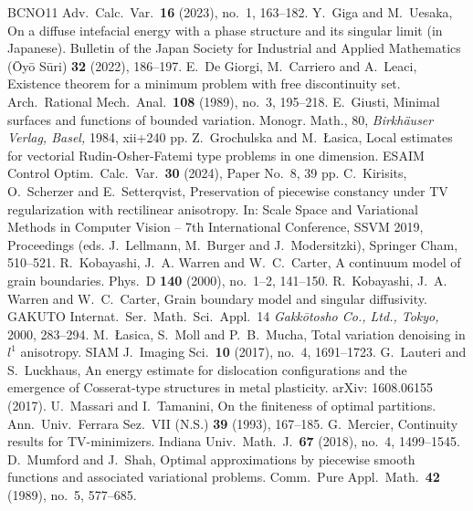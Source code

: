 \documentclass[11pt]{amsart} %
\numberwithin{equation}{section}
\begin{document}
\begin{thebibliography}{BCNO11}
Adv.\ Calc.\ Var.\ {\bf16} (2023), no.\ 1, 163--182.
%
Y.\ Giga and M.\ Uesaka, 
On a diffuse intefacial energy with a phase structure and its singular limit (in Japanese). 
Bulletin of the Japan Society for Industrial and Applied Mathematics (\={O}y\={o} S\={u}ri) {\bf32} (2022), 186--197.
%
E.\ De Giorgi, M.\ Carriero and A.\ Leaci, 
Existence theorem for a minimum problem with free discontinuity set. 
Arch.\ Rational Mech.\ Anal.\ {\bf108} (1989), no.\ 3, 195--218.
%
E.\ Giusti, 
Minimal surfaces and functions of bounded variation. 
Monogr. Math., 80, 
\emph{Birkh\"auser Verlag, Basel,} 1984, x\hspace{-1pt}i\hspace{-1pt}i+240 pp.
%
Z.\ Grochulska and M.\ \L asica, 
Local estimates for vectorial Rudin-Osher-Fatemi type problems in one dimension. 
ESAIM Control Optim.\ Calc.\ Var.\ {\bf30} (2024), Paper No.\ 8, 39 pp.
%
C.\ Kirisits, O.\ Scherzer and E.\ Setterqvist, 
Preservation of piecewise constancy under TV regularization with rectilinear anisotropy. 
In: Scale Space and Variational Methods in Computer Vision -- 7th International Conference, SSVM 2019, Proceedings (eds. J.\ Lellmann, M.\ Burger and J.\ Modersitzki), Springer Cham, 510--521.
%
R.\ Kobayashi, J.\ A. Warren and W.\ C.\ Carter, 
A continuum model of grain boundaries. 
Phys.\ D {\bf140} (2000), no.\ 1--2, 141--150.
%
R.\ Kobayashi, J.\ A. Warren and W.\ C.\ Carter, 
Grain boundary model and singular diffusivity. 
GAKUTO Internat.\ Ser.\ Math.\ Sci.\ Appl.\ 14
\emph{Gakk\=otosho Co., Ltd., Tokyo,} 2000, 283--294.
%
M.\ \L asica, S.\ Moll and P.\ B.\ Mucha, 
Total variation denoising in $l^1$ anisotropy. 
SIAM J.\ Imaging Sci.\ {\bf10} (2017), no.\ 4, 1691--1723.
%
G.\ Lauteri and S.\ Luckhaus, 
An energy estimate for dislocation configurations and the emergence of Cosserat-type structures in metal plasticity. 
arXiv: 1608.06155 (2017).
%
U.\ Massari and I.\ Tamanini, 
On the finiteness of optimal partitions. 
Ann.\ Univ.\ Ferrara Sez.\ V\!I\!I (N.S.) {\bf39} (1993), 167--185.
%
G.\ Mercier, 
Continuity results for TV-minimizers. 
Indiana Univ.\ Math.\ J.\ {\bf67} (2018), no.\ 4, 1499--1545.
%
D.\ Mumford and J.\ Shah, 
Optimal approximations by piecewise smooth functions and associated variational problems. 
Comm.\ Pure Appl.\ Math.\ {\bf42} (1989), no.\ 5, 577--685.

\end{thebibliography}
\end{document}
